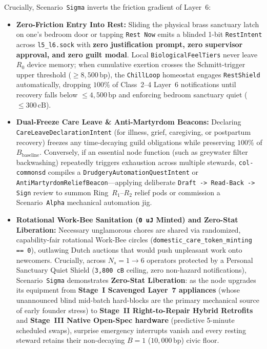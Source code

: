 Crucially, Scenario~\texttt{Sigma} inverts the friction gradient of Layer~6:
\begin{itemize}
    \item \textbf{Zero-Friction Entry Into Rest:} Sliding the physical brass sanctuary latch on one's bedroom door or tapping \texttt{Rest Now} emits a blinded 1-bit \texttt{RestIntent} across \texttt{l5\_l6.sock} with \textbf{zero justification prompt, zero supervisor approval, and zero guilt modal}. Local \texttt{BiologicalFeelTiers} never leave $R_0$ device memory; when cumulative exertion crosses the Schmitt-trigger upper threshold ($\ge 8{,}500\,\mathrm{bp}$), the \texttt{ChillLoop} homeostat engages \texttt{RestShield} automatically, dropping $100\%$ of Class~2--4 Layer~6 notifications until recovery falls below $\le 4{,}500\,\mathrm{bp}$ and enforcing bedroom sanctuary quiet ($\le 300\,\mathrm{cB}$).
    \item \textbf{Dual-Freeze Care Leave \& Anti-Martyrdom Beacons:} Declaring \texttt{CareLeaveDeclarationIntent} (for illness, grief, caregiving, or postpartum recovery) freezes any time-decaying guild obligations while preserving $100\%$ of $B_{\mathrm{baseline}}$. Conversely, if an essential node function (such as greywater filter backwashing) repeatedly triggers exhaustion across multiple stewards, \texttt{col-commonsd} compiles a \texttt{DrudgeryAutomationQuestIntent} or \texttt{AntiMartyrdomReliefBeacon}---applying deliberate \texttt{Draft -> Read-Back -> Sign} review to summon Ring~$R_1\text{--}R_2$ relief pods or commission a Scenario~\texttt{Alpha} mechanical automation jig.
    \item \textbf{Rotational Work-Bee Sanitation (\texttt{0 uJ} Minted) and Zero-Stat Liberation:} Necessary unglamorous chores are shared via randomized, capability-fair rotational Work-Bee circles (\texttt{domestic\_care\_token\_minting == 0}), outlawing Dutch auctions that would push unpleasant work onto newcomers. Crucially, across $N_s = 1 \to 6$ operators protected by a Personal Sanctuary Quiet Shield (\texttt{3,800 cB} ceiling, zero non-hazard notifications), Scenario~\texttt{Sigma} demonstrates \textbf{Zero-Stat Liberation}: as the node upgrades its equipment from \textbf{Stage~I Scavenged Layer~7 appliances} (whose unannounced blind mid-batch hard-blocks are the primary mechanical source of early founder stress) to \textbf{Stage~II Right-to-Repair Hybrid Retrofits} and \textbf{Stage~III Native Open-Spec hardware} (predictive 5-minute scheduled swaps), surprise emergency interrupts vanish and every resting steward retains their non-decaying $B = 1$ ($10{,}000\,\mathrm{bp}$) civic floor.
\end{itemize}

